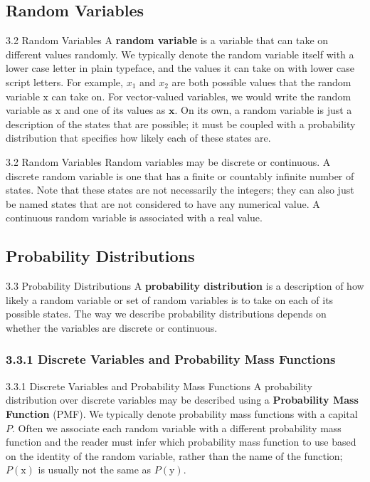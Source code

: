 \subsection{Random Variables}
\begin{frame}{3.2 Random Variables}
    \justifying
    A \textbf{random variable} is a variable that can take on different values randomly. We typically denote the random variable itself with a lower case letter in plain typeface, and the values it can take on with lower case script letters. For example, $x_{1}$ and $x_{2}$ are both possible values that the random variable $\mathrm{x}$ can take on. For vector-valued variables, we would write the random variable as $\boldsymbol{\mathrm{x}}$ and one of its values as $\boldsymbol{x}$. On its own, a random variable is just a description of the states that are possible; it must be coupled with a probability distribution that specifies how likely each of these states are.
\end{frame}

\begin{frame}{3.2 Random Variables}
    \justifying
    Random variables may be discrete or continuous. A discrete random variable is one that has a finite or countably infinite number of states. Note that these states are not necessarily the integers; they can also just be named states that are not considered to have any numerical value. A continuous random variable is associated with a real value.
\end{frame}

\subsection{Probability Distributions}
\begin{frame}{3.3 Probability Distributions}
    \justifying
    A \textbf{probability distribution} is a description of how likely a random variable or set of random variables is to take on each of its possible states. The way we describe probability distributions depends on whether the variables are discrete or continuous.
\end{frame}

\subsubsection{3.3.1 Discrete Variables and Probability Mass Functions}
\begin{frame}{3.3.1 Discrete Variables and Probability Mass Functions}
    \justifying
    A probability distribution over discrete variables may be described using a \textbf{Probability Mass Function} (PMF). We typically denote probability mass functions with a capital $P$. Often we associate each random variable with a different probability mass function and the reader must infer which probability mass function to use based on the identity of the random variable, rather than the name of the function; $P(\mathrm{x})$ is usually not the same as $P(\mathrm{y})$.
\end{frame}{}


